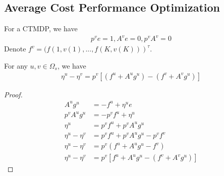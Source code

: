 \documentclass[runningheads]{llncs}
\begin{document}
    \subsection{Average Cost Performance Optimization}
    For a CTMDP, we have
    \begin{align}
        p^v e = 1, A^v e = 0, p^v A^v = 0
    \end{align}
    Denote $f^v = (f(1, v(1), ..., f(K, v(K)))^\tau$.
    \begin{lemma}
        For any $u, v \in \Omega_s$, we have
        \begin{align}
            \eta^u - \eta^v = p^v [(f^u + A^ug^u) - (f^v + A^vg^u)]
        \end{align}
    \end{lemma}
    \begin{proof}
        \begin{align}
            A^ug^u &= -f^u + \eta^u e\\
            p^vA^ug^u &= -p^v f^u + \eta^u \\
            \eta^u &= p^vf^u + p^vA^ug^u\\
            \eta^u - \eta^v &= p^vf^u + p^vA^ug^u - p^vf^v \\
            \eta^u - \eta^v &= p^v (f^u + A^ug^u - f^v) \\
            \eta^u - \eta^v &= p^v [f^u + A^u g^u -(f^v + A^v g^u)]
        \end{align}
    \end{proof}
\end{document}
